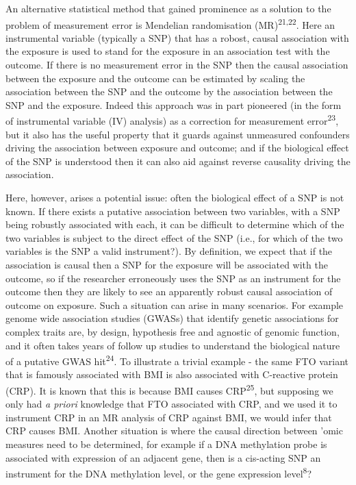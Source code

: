 \documentclass[]{article}
\begin{document}
An alternative statistical method that gained prominence as a solution
to the problem of measurement error is Mendelian randomisation
(MR)\textsuperscript{21,22}. Here an instrumental variable (typically a
SNP) that has a robost, causal association with the exposure is used to
stand for the exposure in an association test with the outcome. If there
is no measurement error in the SNP then the causal association between
the exposure and the outcome can be estimated by scaling the association
between the SNP and the outcome by the association between the SNP and
the exposure. Indeed this approach was in part pioneered (in the form of
instrumental variable (IV) analysis) as a correction for measurement
error\textsuperscript{23}, but it also has the useful property that it
guards against unmeasured confounders driving the association between
exposure and outcome; and if the biological effect of the SNP is
understood then it can also aid against reverse causality driving the
association.

Here, however, arises a potential issue: often the biological effect of
a SNP is not known. If there exists a putative association between two
variables, with a SNP being robustly associated with each, it can be
difficult to determine which of the two variables is subject to the
direct effect of the SNP (i.e., for which of the two variables is the
SNP a valid instrument?). By definition, we expect that if the
association is causal then a SNP for the exposure will be associated
with the outcome, so if the researcher erroneously uses the SNP as an
instrument for the outcome then they are likely to see an apparently
robust causal association of outcome on exposure. Such a situation can
arise in many scenarios. For example genome wide association studies
(GWASs) that identify genetic associations for complex traits are, by
design, hypothesis free and agnostic of genomic function, and it often
takes years of follow up studies to understand the biological nature of
a putative GWAS hit\textsuperscript{24}. To illustrate a trivial example
- the same FTO variant that is famously associated with BMI is also
associated with C-reactive protein (CRP). It is known that this is
because BMI causes CRP\textsuperscript{25}, but supposing we only had
\emph{a priori} knowledge that FTO associated with CRP, and we used it
to instrument CRP in an MR analysis of CRP against BMI, we would infer
that CRP causes BMI. Another situation is where the causal direction
between 'omic measures need to be determined, for example if a DNA
methylation probe is associated with expression of an adjacent gene,
then is a cis-acting SNP an instrument for the DNA methylation level, or
the gene expression level\textsuperscript{8}?
\end{document}
